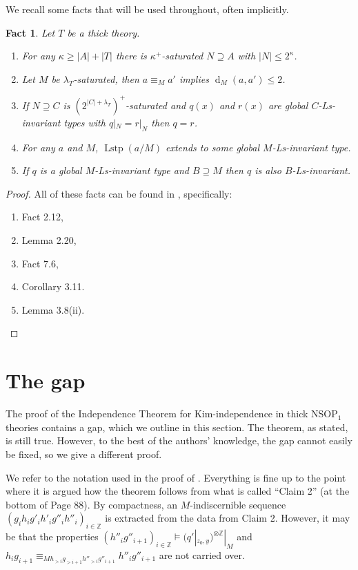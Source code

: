 \documentclass[a4paper, reqno]{amsart}
\newtheorem{fact}[theorem]{Fact}
\theoremstyle{definition}
\theoremstyle{repeat}
\newcommand{\Z}{\mathbb{Z}}
\DeclareMathOperator{\Lstp}{Lstp}
\renewcommand{\d}{\operatorname{d}}
\begin{document}
We recall some facts that will be used throughout, often implicitly.
\begin{fact}
Let $T$ be a thick theory.
\begin{enumerate}[label=(\roman*)]
\item For any $\kappa \geq |A| + |T|$ there is $\kappa^+$-saturated $N \supseteq A$ with $|N| \leq 2^\kappa$.
\item Let $M$ be $\lambda_T$-saturated, then $a \equiv_M a'$ implies $\d_M(a, a') \leq 2$.
\item If $N \supseteq C$ is $(2^{|C| + \lambda_T})^+$-saturated and $q(x)$ and $r(x)$ are global $C$-Ls-invariant types with $q|_N = r|_N$ then $q = r$.
\item For any $a$ and $M$, $\Lstp(a/M)$ extends to some global $M$-Ls-invariant type.
\item If $q$ is a global $M$-Ls-invariant type and $B \supseteq M$ then $q$ is also $B$-Ls-invariant.
\end{enumerate}
\end{fact}
\begin{proof}
All of these facts can be found in \cite{dobrowolski_kim-independence_2022}, specifically:
\begin{enumerate}[label=(\roman*)]
\item Fact 2.12,
\item Lemma 2.20,
\item Fact 7.6,
\item Corollary 3.11.
\item Lemma 3.8(ii).
\end{enumerate}
\end{proof}

\section{The gap}
\label{sec:the-gap}
The proof of the Independence Theorem for Kim-independence in thick NSOP$_1$ theories \cite[Theorem 7.7]{dobrowolski_kim-independence_2022} contains a gap, which we outline in this section. The theorem, as stated, is still true. However, to the best of the authors' knowledge, the gap cannot easily be fixed, so we give a different proof.

We refer to the notation used in the proof of \cite[Theorem 7.7]{dobrowolski_kim-independence_2022}. Everything is fine up to the point where it is argued how the theorem follows from what is called ``Claim 2'' (at the bottom of Page 88). By compactness, an $M$-indiscernible sequence $(g_i h_i g'_i h'_i g''_i h''_i)_{i \in \Z}$ is extracted from the data from Claim 2. However, it may be that the properties $(h''_i g''_{i+1})_{i \in \Z} \models (q'|_{z_0, y})^{\otimes \Z}|_M$ and $h_i g_{i+1} \equiv_{M h_{>i} g_{>i+1} h''_{>i} g''_{i+1}} h''_i g''_{i+1}$ are not carried over.
\end{document}
